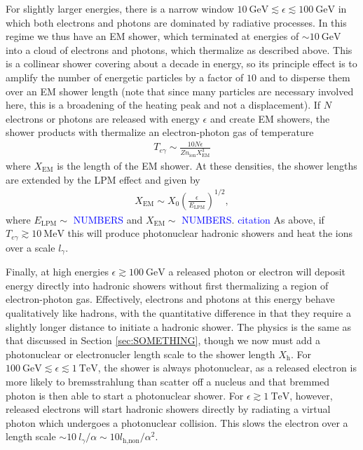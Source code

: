 \documentclass[twocolumn,showpacs,preprintnumbers,amsmath,amssymb,prd]{revtex4}
\newcommand{\TeV}{\text{TeV}}
\newcommand{\GeV}{\text{GeV}}
\newcommand{\MeV}{\text{MeV}}
\def\r{\right)}
\def\l{\left(}
\begin{document}
For slightly larger energies, there is a narrow window $10~\GeV \lesssim \epsilon \lesssim 100~\GeV$ in which both electrons and photons are dominated by radiative processes.
In this regime we thus have an EM shower, which terminated at energies of $\sim 10~\GeV$ into a cloud of electrons and photons, which thermalize as described above.
This is a collinear shower covering about a decade in energy, so its principle effect is to amplify the number of energetic particles by a factor of $10$ and to disperse them over an EM shower length (note that since many particles are necessary involved here, this is a broadening of the heating peak and not a displacement).
If $N$ electrons or photons are released with energy $\epsilon$ and create EM showers, the shower products with thermalize an electron-photon gas of temperature  
\begin{align}
  T_{e\gamma} \sim \frac{10 N \epsilon}{Z n_\text{ion} X_\text{EM}^3}
\end{align}
where $X_\text{EM}$ is the length of the EM shower.
At these densities, the shower lengths are extended by the LPM effect and given by
\begin{align}
  X_\text{EM} \sim X_0 \l \frac{\epsilon}{E_\text{LPM}} \r^{1/2},
\end{align}
where $E_\text{LPM} \sim$ \textcolor{blue}{NUMBERS} and $X_\text{EM} \sim$ \textcolor{blue}{NUMBERS}. \textcolor{blue}{citation}
As above, if $T_{e\gamma} \gtrsim 10~\MeV$ this will produce photonuclear hadronic showers and heat the ions over a scale $l_\gamma$. 

Finally, at high energies $\epsilon \gtrsim 100~\GeV$ a released photon or electron will deposit energy directly into hadronic showers without first thermalizing a region of electron-photon gas. 
Effectively, electrons and photons at this energy behave qualitatively like hadrons, with the quantitative difference in that they require a slightly longer distance to initiate a hadronic shower. 
The physics is the same as that discussed in Section \ref{sec:SOMETHING}, though we now must add a photonuclear or electronucler length scale to the shower length $X_\text{h}$.  
For $100~\GeV \lesssim \epsilon \lesssim 1~\TeV$, the shower is always photonuclear, as a released electron is more likely to bremsstrahlung than scatter off a nucleus and that bremmed photon is then able to start a photonuclear shower. 
For $\epsilon \gtrsim 1~\TeV$, however, released electrons will start hadronic showers directly by radiating a virtual photon which undergoes a photonuclear collision.
This slows the electron over a length scale $\sim 10~l_\gamma/\alpha \sim 10 l_\text{h,non}/\alpha^2 $.
\end{document}
